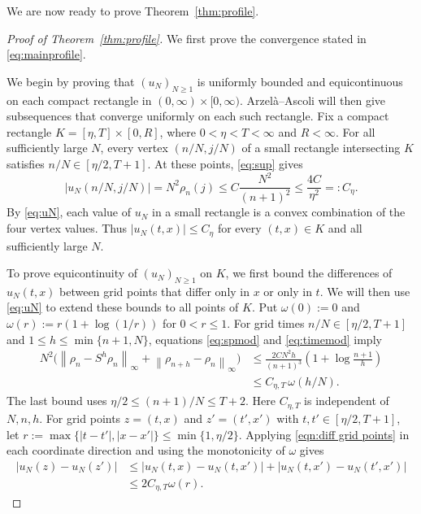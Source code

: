 \documentclass[11pt,letterpaper,reqno]{amsart}
\numberwithin{equation}{section}
\theoremstyle{plain}
\theoremstyle{remark}
\newcommand{\norm}[1]{\left\lVert#1\right\rVert}
\begin{document}
We are now ready to prove Theorem~\ref{thm:profile}.
\begin{proof}[Proof of Theorem~\ref{thm:profile}]
We first prove the convergence stated in \eqref{eq:mainprofile}.

We begin by proving that $(u_N)_{N\ge1}$ is uniformly bounded and equicontinuous on each compact rectangle in $(0,\infty)\times[0,\infty)$. Arzel\`a--Ascoli will then give subsequences that converge uniformly on each such rectangle. Fix a compact rectangle $K=[\eta,T]\times[0,R]$, where $0<\eta<T<\infty$ and $R<\infty$. For all sufficiently large $N$, every vertex $(n/N,j/N)$ of a small rectangle intersecting $K$ satisfies $n/N\in[\eta/2,T+1]$. At these points, \eqref{eq:sup} gives
\[
 |u_N(n/N,j/N)|=N^2\rho_n(j)
 \le C\frac{N^2}{(n+1)^2}\le \frac{4C}{\eta^2}=: C_\eta.
\]
By \eqref{eq:uN}, each value of $u_N$ in a small rectangle is a convex combination of the four vertex values. Thus $|u_N(t,x)|\le C_\eta$ for every $(t,x)\in K$ and all sufficiently large $N$.

To prove equicontinuity of $(u_N)_{N\ge 1}$ on $K$, we first bound the differences of $u_N(t,x)$ between grid points that differ only in $x$ or only in $t$. We will then use \eqref{eq:uN} to extend these bounds to all points of $K$. Put $\omega(0):=0$ and $\omega(r):=r(1+\log(1/r))$ for $0<r\le1$. For grid times $n/N \in [\eta/2,T+1]$ and $1\le h\le\min\{n+1,N\}$, equations \eqref{eq:spmod} and \eqref{eq:timemod} imply
\begin{equation}\label{eqn:diff grid points}
  \begin{split}
 N^2\bigl(\norm{\rho_n-S^h\rho_n}_\infty
       +\norm{\rho_{n+h}-\rho_n}_\infty\bigr)
  &\le \frac{2CN^2h}{(n+1)^3}
       \left(1+\log\frac{n+1}{h}\right)\\
 &\le C_{\eta,T}\,\omega(h/N).
 \end{split}
\end{equation}
The last bound uses $\eta/2\le(n+1)/N\le T+2$. Here $C_{\eta,T}$ is independent of $N,n,h$.
For grid points $z=(t,x)$ and $z'=(t',x')$ with $t,t'\in[\eta/2,T+1]$, let $r:=\max\{|t-t'|,|x-x'|\}\le\min\{1,\eta/2\}$. Applying \eqref{eqn:diff grid points} in each coordinate direction and using the monotonicity of $\omega$ gives
\[
 \begin{split}
 |u_N(z)-u_N(z')|
 &\le |u_N(t,x)-u_N(t,x')|
       +|u_N(t,x')-u_N(t',x')|\\
 &\le 2C_{\eta,T}\omega(r).
 \end{split}
\]


\end{proof}
\end{document}
